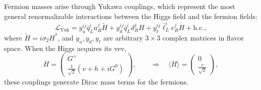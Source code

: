 Fermion masses arise through Yukawa couplings, which represent the most general renormalizable interactions between the Higgs field and the fermion fields:
\begin{equation}
    \mathcal{L}_{\text{Yuk}} = y_{u}^{ij} \bar{q}_{L}^{i} u_{R}^{j} \tilde{H} + y_{d}^{ij} \bar{q}_{L}^{i} d_{R}^{j} H + y_{\ell}^{ij} \bar{\ell}_L^{i} e_{R}^{j} H + \text{h.c.},
\end{equation}
where $\tilde{H} = i\sigma_2 H^*$, and $y_{u}, y_{d}, y_{\ell}$ are arbitrary $3 \times 3$ complex matrices in flavor space. When the Higgs acquires its vev, 
\begin{equation}
		H = \begin{pmatrix} G^{+} \\ \frac{1}{\sqrt{2}}(v + h + i G^{0}) \end{pmatrix},\qquad \Longrightarrow \quad \langle H \rangle = \begin{pmatrix} 0 \\ \frac{v}{\sqrt{2}} \end{pmatrix},
\end{equation}
these couplings generate Dirac mass terms for the fermions.

